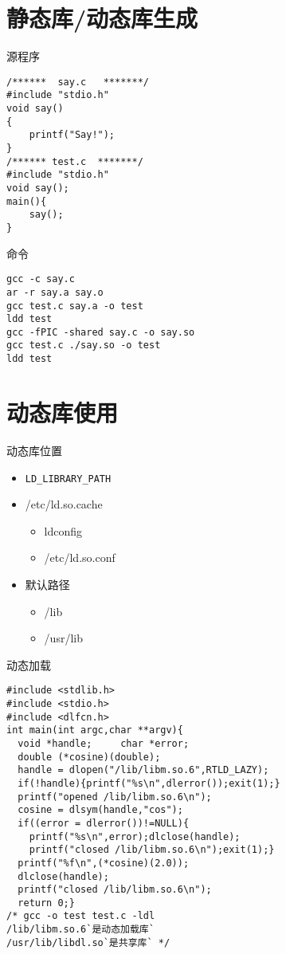 \section{静态库/动态库生成}

\begin{frame}[containsverbatim]{源程序}
\lstset{language=c++}
\begin{lstlisting}
/******  say.c   *******/
#include "stdio.h"
void say()
{
	printf("Say!");
}
/****** test.c  *******/
#include "stdio.h"
void say();
main(){
	say();
}
\end{lstlisting}
\end{frame}

\begin{frame}[containsverbatim]{命令}
\lstset{language=ksh}
\begin{lstlisting}
gcc -c say.c
ar -r say.a say.o
gcc test.c say.a -o test
ldd test
gcc -fPIC -shared say.c -o say.so
gcc test.c ./say.so -o test
ldd test
\end{lstlisting}
\end{frame}


\section{动态库使用}
 
\begin{frame}[containsverbatim]{动态库位置}
\begin{itemize}
\item 
\lstset{language=c++}
\begin{lstlisting}
LD_LIBRARY_PATH
\end{lstlisting}
\item 
/etc/ld.so.cache
\begin{itemize}
\item ldconfig
\item /etc/ld.so.conf
\end{itemize}
\item 默认路径
\begin{itemize}
\item /lib
\item /usr/lib
\end{itemize}
\end{itemize}
\end{frame}

\begin{frame}[containsverbatim]{动态加载}
\lstset{language=c++,escapeinside=``}
\begin{lstlisting}
#include <stdlib.h>
#include <stdio.h>
#include <dlfcn.h>
int main(int argc,char **argv){
  void *handle;     char *error;
  double (*cosine)(double);
  handle = dlopen("/lib/libm.so.6",RTLD_LAZY);
  if(!handle){printf("%s\n",dlerror());exit(1);}
  printf("opened /lib/libm.so.6\n");
  cosine = dlsym(handle,"cos");
  if((error = dlerror())!=NULL){
    printf("%s\n",error);dlclose(handle);
    printf("closed /lib/libm.so.6\n");exit(1);}
  printf("%f\n",(*cosine)(2.0));
  dlclose(handle);
  printf("closed /lib/libm.so.6\n");
  return 0;}
/* gcc -o test test.c -ldl
/lib/libm.so.6`是动态加载库`
/usr/lib/libdl.so`是共享库` */
\end{lstlisting}
\end{frame}


